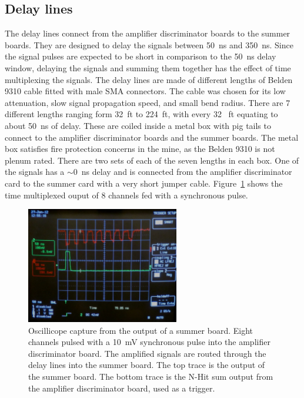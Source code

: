 \documentclass{JINST}
\begin{document}
\subsection{Delay lines}
\label{sec:Delay}
%
The delay lines connect from the amplifier discriminator boards to the
summer boards. They are designed to delay the signals between 50~ns and 350~ns.
Since the signal pulses are expected to be short in
comparison to the 50~ns delay window, delaying the signals and summing
them together has the effect of time multiplexing the signals. The
delay lines are made of different lengths of Belden 9310 cable fitted
with male SMA connectors. The cable was chosen for its low
attenuation, slow signal propagation speed, and small bend radius.
There are 7 different lengths ranging form 32~ft to 224~ft, with every 32~ ft
equating to about 50~ns of delay. These are coiled inside a metal box
with pig tails to connect to the amplifier discriminator boards and
the summer boards. The metal box satisfies fire protection concerns
in the mine, as the Belden 9310 is not plenum rated. There are two
sets of each of the seven lengths in each box. One of the signals has
a $\sim$0~ns delay and is connected from the amplifier discriminator card to
the summer card with a very short jumper cable. Figure~\ref{fig:multipulse}
shows the time multiplexed ouput of 8 channels fed with a synchronous pulse.

\begin{figure}[ht]
\begin{center}
	\includegraphics[height=2in, keepaspectratio=true]{graphics/delaypulse.jpg}
	\caption{Oscillicope capture from the output of a summer board. Eight channels
		pulsed with a 10~mV synchronous pulse into the amplifier discriminator board. The amplified
		signals are routed through the delay lines into the summer board. The top trace is
		the output of the summer board. The bottom trace is the N-Hit sum output from the
		amplifier discriminator board, used as a trigger.
\label{fig:multipulse}}
\end{center}
\end{figure}
\end{document}
